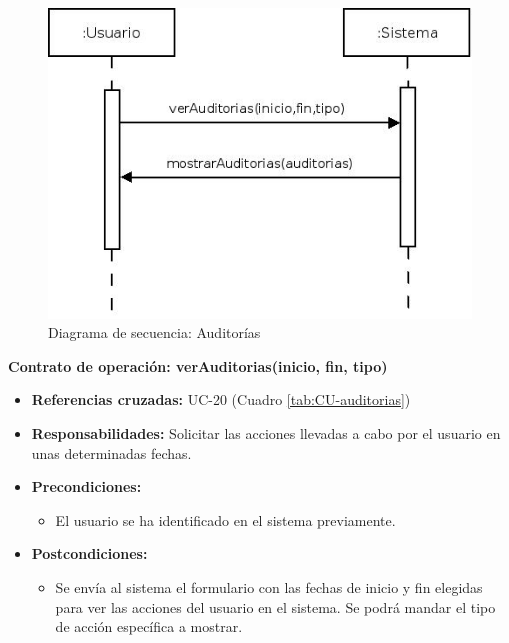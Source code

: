\begin{figure}[h!]
\centering
  \includegraphics[scale=.55]{img/secuencias/auditorias.jpeg}
  \caption{Diagrama de secuencia: Auditorías}
  \label{fig:secuencia-auditorias}
\end{figure}

\textbf{Contrato de operación: verAuditorias(inicio, fin, tipo)}
\begin{itemize}
\item \textbf{Referencias cruzadas:} UC-20 (Cuadro \ref{tab:CU-auditorias})
\item \textbf{Responsabilidades:} Solicitar las acciones llevadas a cabo por el usuario en unas determinadas fechas.
\item \textbf{Precondiciones:} 
 \begin{itemize}
\item El usuario se ha identificado en el sistema previamente.
\end {itemize}
\item \textbf{Postcondiciones:} 
 \begin{itemize}
\item Se envía al sistema el formulario con las fechas de inicio y fin elegidas para ver las acciones del usuario en el sistema. Se podrá mandar el tipo de acción específica a mostrar.
\end {itemize}
\end {itemize}

